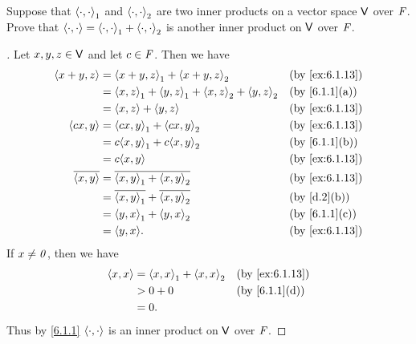 \begin{ex}\label{ex:6.1.13}
  Suppose that \(\left\langle\cdot, \cdot\right\rangle_1\) and \(\left\langle\cdot, \cdot\right\rangle_2\) are two inner products on a vector space \(\mathsf{V}\) over \(\mathit{F}\).
  Prove that \(\left\langle\cdot, \cdot\right\rangle = \left\langle\cdot, \cdot\right\rangle_1 + \left\langle\cdot, \cdot\right\rangle_2\) is another inner product on \(\mathsf{V}\) over \(\mathit{F}\).
\end{ex}

\begin{proof}[]
  Let \(x, y, z \in \mathsf{V}\) and let \(c \in \mathit{F}\).
  Then we have
  \begin{align*}
    \inn{x + y, z}    & = \inn{x + y, z}_1 + \inn{x + y, z}_2                       &  & \by{ex:6.1.13} \\
                      & = \inn{x, z}_1 + \inn{y, z}_1 + \inn{x, z}_2 + \inn{y, z}_2 &  & \by{6.1.1}[a]  \\
                      & = \inn{x, z} + \inn{y, z}                                   &  & \by{ex:6.1.13} \\
    \inn{cx, y}       & = \inn{cx, y}_1 + \inn{cx, y}_2                             &  & \by{ex:6.1.13} \\
                      & = c \inn{x, y}_1 + c \inn{x, y}_2                           &  & \by{6.1.1}[b]  \\
                      & = c \inn{x, y}                                              &  & \by{ex:6.1.13} \\
    \conj{\inn{x, y}} & = \conj{\inn{x, y}_1 + \inn{x, y}_2}                        &  & \by{ex:6.1.13} \\
                      & = \conj{\inn{x, y}_1} + \conj{\inn{x, y}_2}                 &  & \by{d.2}[b]    \\
                      & = \inn{y, x}_1 + \inn{y, x}_2                               &  & \by{6.1.1}[c]  \\
                      & = \inn{y, x}.                                               &  & \by{ex:6.1.13}
  \end{align*}
  If \(x \neq \mathit{0}\), then we have
  \begin{align*}
    \inn{x, x} & = \inn{x, x}_1 + \inn{x, x}_2 &  & \by{ex:6.1.13} \\
               & > 0 + 0                       &  & \by{6.1.1}[d]  \\
               & = 0.
  \end{align*}
  Thus by \cref{6.1.1} \(\left\langle\cdot, \cdot\right\rangle\) is an inner product on \(\mathsf{V}\) over \(\mathit{F}\).
\end{proof}

